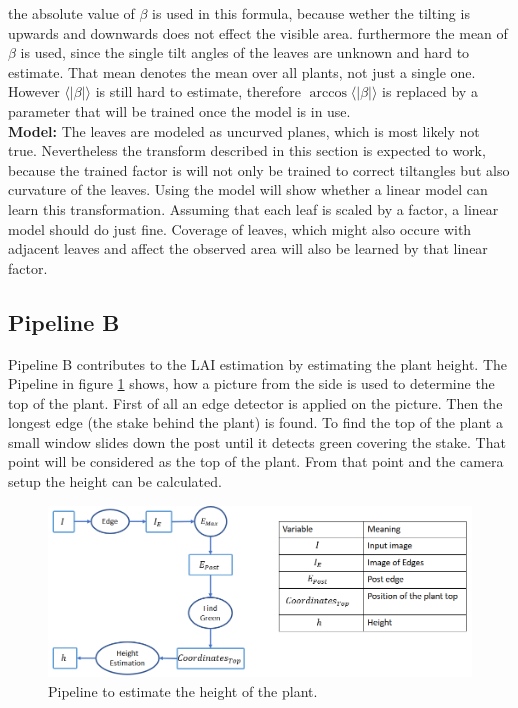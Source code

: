 the absolute value of $\beta$ is used in this formula, because wether the tilting is upwards and downwards does not effect the visible area. furthermore the mean of $\beta$ is used, since the single tilt angles of the leaves are unknown and hard to estimate. That mean denotes the mean over all plants, not just a single one. However $\langle |\beta |\rangle$ is still hard to estimate, therefore $\arccos \langle |\beta |\rangle$ is replaced by a parameter that will be trained once the model is in use.\\
\textbf{Model: } The leaves are modeled as uncurved planes, which is most likely not true. Nevertheless the transform described in this section is expected to work, because the trained factor is will not only be trained to correct tiltangles but also curvature of the leaves. Using the model will show whether a linear model can learn this transformation. Assuming that each leaf is scaled by a factor, a linear model should do just fine. Coverage of leaves, which might also occure with adjacent leaves and affect the observed area will also be learned by that linear factor.

\subsection{Pipeline B}\label{subsec:pipeline-b}


Pipeline B contributes to the LAI estimation by estimating the plant height.
The Pipeline in figure \ref{fig:pipelineB} shows, how a picture from the side is used to determine the top of the plant. First of all an edge detector is applied on the picture. Then the longest edge (the stake behind the plant) is found. To find the top of the plant a small window slides down the post until it detects green covering the stake. That point will be considered as the top of the plant. From that point and the camera setup the height can be calculated. 

\begin{figure}[H]
   \centering
   \includegraphics[scale=0.9]{pipelineB.PNG}
   \caption{Pipeline to estimate the height of the plant.}
   \label{fig:pipelineB}
\end{figure}

